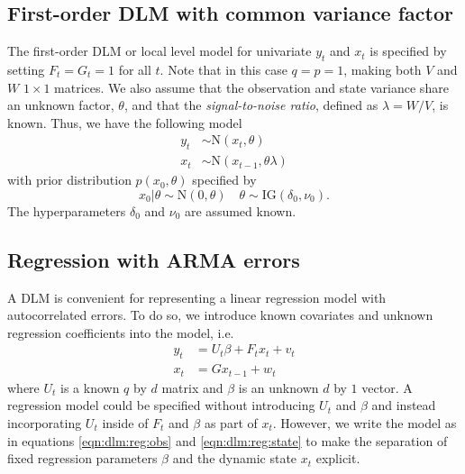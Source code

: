 \subsection{First-order DLM with common variance factor \label{sec:dlm:ll}}

The first-order DLM or local level model for univariate $y_t$ and $x_t$ is specified by setting $F_t = G_t = 1$ for all $t$. Note that in this case $q = p = 1$, making both $V$ and $W$ $1 \times 1$ matrices. We also assume that the observation and state variance share an unknown factor, $\theta$, and that the \emph{signal-to-noise ratio}, defined as $\lambda = W / V$, is known. Thus, we have the following model
\begin{align}
y_t &\sim \mbox{N}(x_t, \theta) \label{eqn:ll:obs} \\
x_t &\sim \mbox{N}(x_{t-1}, \theta\lambda) \label{eqn:ll:state}
\end{align}
with prior distribution $p(x_0, \theta)$ specified by
\begin{equation}
x_0|\theta \sim \mbox{N}(0, \theta) \quad \theta \sim \mbox{IG}(\delta_0,\nu_0). \label{eqn:ll:prior}
\end{equation}
The hyperparameters $\delta_0$ and $\nu_0$ are assumed known.

\subsection{Regression with ARMA errors \label{sec:dlm:arma}}

A DLM is convenient for representing a linear regression model with autocorrelated errors. To do so, we introduce known covariates and unknown regression coefficients into the model, i.e.
\begin{align}
y_t &= U_t\beta + F_tx_t + v_t \label{eqn:dlm:reg:obs} \\
x_t &= Gx_{t-1} + w_t \label{eqn:dlm:reg:state}
\end{align}
where $U_t$ is a known $q$ by $d$ matrix and $\beta$ is an unknown $d$ by $1$ vector. A regression model could be specified without introducing $U_t$ and $\beta$ and instead incorporating $U_t$ inside of $F_t$ and $\beta$ as part of $x_t$. However, we write the model as in equations \eqref{eqn:dlm:reg:obs} and \eqref{eqn:dlm:reg:state} to make the separation of fixed regression parameters $\beta$ and the dynamic state $x_t$ explicit.


